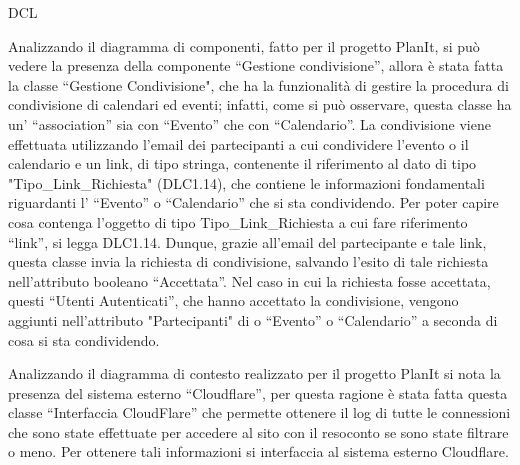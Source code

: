\begin{listaPersonale}{DCL}
\begin{listaPersonale2}[DCL]{}
        Analizzando il diagramma di componenti, fatto per il progetto PlanIt, si può vedere la presenza della componente “Gestione condivisione”, allora è stata fatta la classe “Gestione Condivisione", che ha la funzionalità di gestire la procedura di condivisione di calendari ed eventi; infatti, come si può osservare, questa classe ha un’ “association” sia con “Evento” che con “Calendario”.  La condivisione viene effettuata utilizzando l’email dei partecipanti a cui condividere l’evento o il calendario e un link, di tipo stringa, contenente il riferimento al dato di tipo "Tipo\_Link\_Richiesta" (DLC1.14), che contiene le informazioni fondamentali riguardanti l’ “Evento” o “Calendario” che si sta condividendo. Per poter capire cosa contenga l’oggetto di tipo Tipo\_Link\_Richiesta a cui fare riferimento “link”, si legga DLC1.14. Dunque, grazie all’email del partecipante e tale link, questa classe invia la richiesta di condivisione, salvando l’esito di tale richiesta nell’attributo booleano “Accettata”. Nel caso in cui la richiesta fosse accettata, questi “Utenti Autenticati”, che hanno accettato la condivisione, vengono aggiunti nell’attributo "Partecipanti" di o “Evento” o “Calendario” a seconda di cosa si sta condividendo.
        
        
            \begin{center}
                
            \end{center}
        
            
    \end{listaPersonale2}



    Analizzando il diagramma di contesto realizzato per il progetto PlanIt si nota la presenza del sistema esterno “Cloudflare”, per questa ragione è stata fatta questa classe “Interfaccia CloudFlare” che permette ottenere il log di tutte le connessioni che sono state effettuate per accedere al sito con il resoconto se sono state filtrare o meno. Per ottenere tali informazioni si interfaccia al sistema esterno Cloudflare.
    
    
        \begin{center}
            
        \end{center}
    

\end{listaPersonale}
